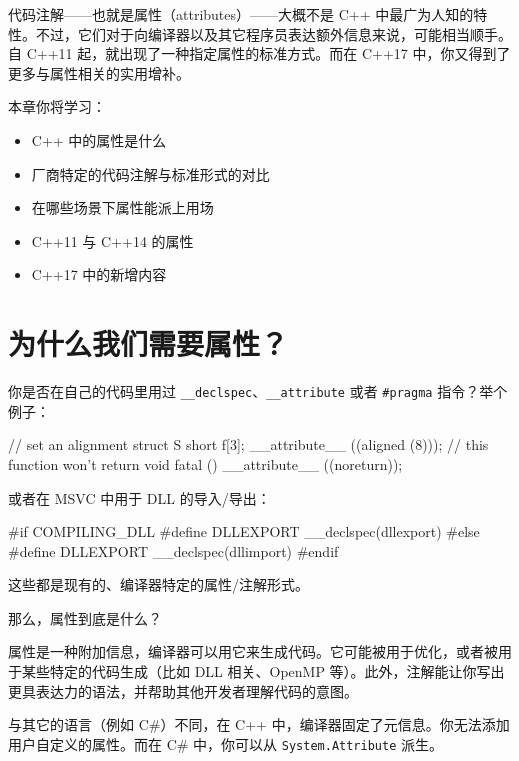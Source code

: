
代码注解——也就是属性（attributes）——大概不是 C++ 中最广为人知的特性。不过，它们对于向编译器以及其它程序员表达额外信息来说，可能相当顺手。自 C++11 起，就出现了一种指定属性的标准方式。而在 C++17 中，你又得到了更多与属性相关的实用增补。

本章你将学习：

\begin{itemize}
\item C++ 中的属性是什么
\item 厂商特定的代码注解与标准形式的对比
\item 在哪些场景下属性能派上用场
\item C++11 与 C++14 的属性
\item C++17 中的新增内容
\end{itemize}

\section{为什么我们需要属性？}

你是否在自己的代码里用过 \texttt{\_\_declspec}、\texttt{\_\_attribute} 或者 \texttt{\#pragma} 指令？举个例子：

\begin{codebox}[cpp]
// set an alignment
struct S { short f[3]; } __attribute__ ((aligned (8)));
// this function won't return
void fatal () __attribute__ ((noreturn));
\end{codebox}

或者在 MSVC 中用于 DLL 的导入/导出：

\begin{codebox}[cpp]
#if COMPILING_DLL
#define DLLEXPORT __declspec(dllexport)
#else
#define DLLEXPORT __declspec(dllimport)
#endif
\end{codebox}

这些都是现有的、编译器特定的属性/注解形式。

那么，属性到底是什么？

属性是一种附加信息，编译器可以用它来生成代码。它可能被用于优化，或者被用于某些特定的代码生成（比如 DLL 相关、OpenMP 等）。此外，注解能让你写出更具表达力的语法，并帮助其他开发者理解代码的意图。

与其它的语言（例如 C\#）不同，在 C++ 中，编译器固定了元信息。你无法添加用户自定义的属性。而在 C\# 中，你可以从 \texttt{System.Attribute} 派生。


